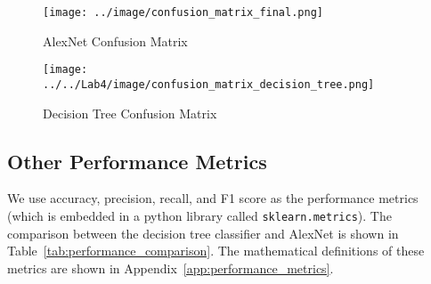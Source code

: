 \documentclass[a4paper,12pt]{article}
\begin{document}
\begin{figure}[h!]
	\centering
	\begin{minipage}{0.45\textwidth}
		\centering
		\texttt{[image: ../image/confusion\_matrix\_final.png]}
		\caption{AlexNet Confusion Matrix}
		\label{fig:confusion_matrix_alexnet}
	\end{minipage}
	\hfill
	\begin{minipage}{0.45\textwidth}
		\centering
		\texttt{[image: ../../Lab4/image/confusion\_matrix\_decision\_tree.png]}
		\caption{Decision Tree Confusion Matrix}
		\label{fig:confusion_matrix_decision_tree}
	\end{minipage}
\end{figure}

\subsection{Other Performance Metrics}
\label{sec:other_performance_metrics}

We use accuracy, precision, recall, and F1 score as the performance metrics (which is embedded in a python library called \texttt{sklearn.metrics}). The comparison between the decision tree classifier and AlexNet is shown in Table~\ref{tab:performance_comparison}. The mathematical definitions of these metrics are shown in Appendix~\ref{app:performance_metrics}.
\end{document}
